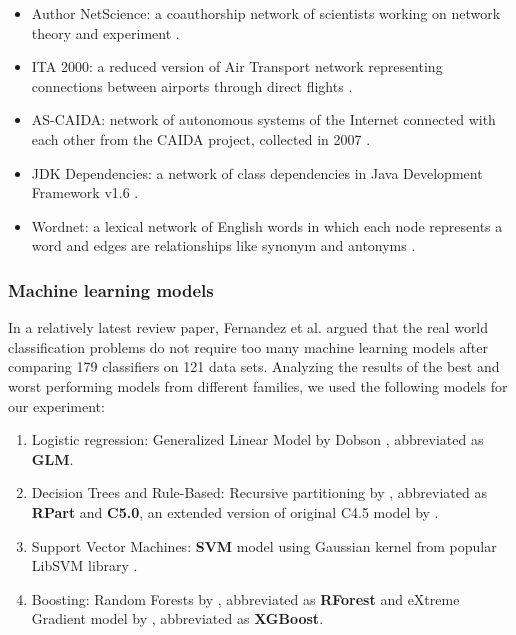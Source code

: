 			\begin{itemize}
				\item Author NetScience: a coauthorship network of scientists working on network theory and experiment \cite{newman2006b}.
				
				\item ITA 2000: a reduced version of Air Transport network representing connections between airports through direct flights \cite{rozenblat2008}.
				
				\item AS-CAIDA: network of autonomous systems of the Internet connected with each other from the CAIDA project, collected in 2007 \cite{ascaida}.
				
				\item JDK Dependencies: a network of class dependencies in Java Development Framework v1.6 \cite{jdk}.
				
				\item Wordnet: a lexical network of English words in which each node represents a word and edges are relationships like synonym and antonyms \cite{fellbaum2012}.
				
			\end{itemize}
			
			
			\subsubsection{Machine learning models}
			In a relatively latest review paper, Fernandez et al. \cite{fernandez2014} argued that the real world classification problems do not require too many machine learning models after comparing 179 classifiers on 121 data sets. Analyzing the results of the best and worst performing models from different families, we used the following models for our experiment:
			
			\begin{enumerate}
				\item Logistic regression: Generalized Linear Model by Dobson \cite{dobson2018}, abbreviated as \textbf{GLM}.
				
				\item Decision Trees and Rule-Based: Recursive partitioning by \cite{breiman1984}, abbreviated as \textbf{RPart} and \textbf{C5.0}, an extended version of original C4.5 model by \cite{quinlan1993}. 
				
				\item Support Vector Machines: \textbf{SVM} model using Gaussian kernel from popular LibSVM library \cite{chang2011}.
				
				\item Boosting: Random Forests by \cite{breiman2001}, abbreviated as \textbf{RForest} and eXtreme Gradient model by \cite{chen2016}, abbreviated as \textbf{XGBoost}.
			\end{enumerate}
			
